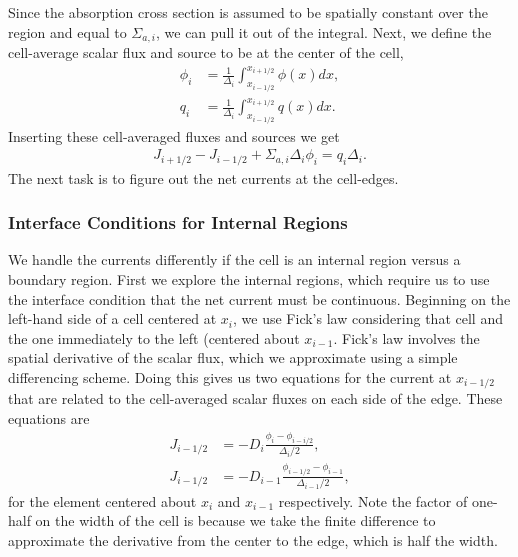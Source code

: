 Since the absorption cross section is assumed to be spatially constant over the region and equal to $\Sigma_{a,i}$, we can pull it out of the integral. Next, we define the cell-average scalar flux and source to be at the center of the cell,
\begin{subequations}
\begin{align}
  \phi_i 	&= \frac{1}{\Delta_i} \int_{x_{i-1/2}}^{x_{i+1/2}} \phi(x) dx , \\
  q_i 		&= \frac{1}{\Delta_i} \int_{x_{i-1/2}}^{x_{i+1/2}} q(x) dx .
\end{align}
\end{subequations}
Inserting these cell-averaged fluxes and sources we get
\begin{align}
  J_{i+1/2} - J_{i-1/2} + \Sigma_{a,i} \Delta_i \phi_i = q_i \Delta_i .
\end{align}
The next task is to figure out the net currents at the cell-edges. 

\subsubsection{Interface Conditions for Internal Regions}

We handle the currents differently if the cell is an internal region versus a boundary region. First we explore the internal regions, which require us to use the interface condition that the net current must be continuous. Beginning on the left-hand side of a cell centered at $x_i$, we use Fick's law considering that cell and the one immediately to the left (centered about $x_{i-1}$. Fick's law involves the spatial derivative of the scalar flux, which we approximate using a simple differencing scheme. Doing this gives us two equations for the current at $x_{i-1/2}$ that are related to the cell-averaged scalar fluxes on each side of the edge. These equations are
\begin{subequations}
\begin{align}
  J_{i-1/2} &= -D_{i}   \frac{ \phi_{i}     - \phi_{i-i/2} }{ \Delta_{i}/2 }, \label{Eq:neutronics_neutronDiffusionFiniteDifference_FicksLawLeftInterface1} \\
  J_{i-1/2} &= -D_{i-1} \frac{ \phi_{i-1/2} - \phi_{i-1}   }{ \Delta_{i-1}/2 },
\end{align}
\end{subequations}
for the element centered about $x_i$ and $x_{i-1}$ respectively. Note the factor of one-half on the width of the cell is because we take the finite difference to approximate the derivative from the center to the edge, which is half the width.

